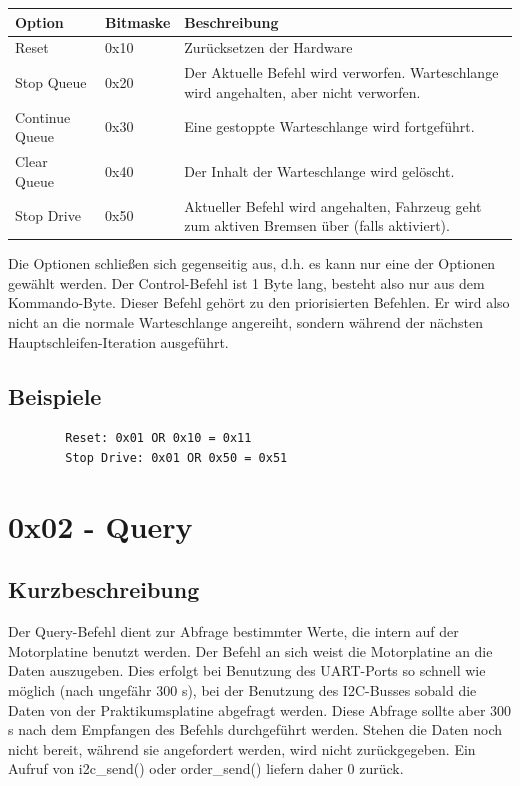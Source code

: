 \documentclass[a4paper]{article}
\begin{document}
	\begin{tabularx}{\linewidth}{|l|l|X|}
		\hline
		\textbf{Option} & \textbf{Bitmaske} & \textbf{Beschreibung} \\
		\hline
		\hline
		Reset 			& 0x10 				& Zurücksetzen der Hardware \\
		\hline
		Stop Queue		& 0x20				& Der Aktuelle Befehl wird verworfen. Warteschlange wird angehalten, aber nicht verworfen. \\
		\hline
		Continue Queue	& 0x30				& Eine gestoppte Warteschlange wird fortgeführt. \\
		\hline
		Clear Queue		& 0x40				& Der Inhalt der Warteschlange wird gelöscht. \\
		\hline
		Stop Drive		& 0x50				& Aktueller Befehl wird angehalten, Fahrzeug geht zum aktiven Bremsen über (falls aktiviert). \\
		\hline
	\end{tabularx}

	Die Optionen schließen sich gegenseitig aus, d.h. es kann nur eine der
	Optionen gewählt werden. Der Control-Befehl ist 1 Byte lang, besteht also
	nur aus dem Kommando-Byte. Dieser Befehl gehört zu den priorisierten
	Befehlen. Er wird also nicht an die normale Warteschlange angereiht,
	sondern während der nächsten Hauptschleifen-Iteration ausgeführt.


	\subsection{Beispiele}
	
	\begin{verbatim}
		Reset: 0x01 OR 0x10 = 0x11
		Stop Drive: 0x01 OR 0x50 = 0x51
	\end{verbatim}
	
	\pagebreak

	\section{0x02 - Query}

	\subsection{Kurzbeschreibung}

	Der Query-Befehl dient zur Abfrage bestimmter Werte, die intern auf der
	Motorplatine benutzt werden. Der Befehl an sich weist die Motorplatine
	an die Daten auszugeben. Dies erfolgt bei Benutzung des UART-Ports so
	schnell wie möglich (nach ungefähr 300 \textmu{}s), bei der Benutzung
	des I2C-Busses sobald die Daten von der Praktikumsplatine abgefragt
	werden. Diese Abfrage sollte aber 300 \textmu{}s nach dem Empfangen
	des Befehls durchgeführt werden. Stehen die Daten noch nicht bereit,
	während sie angefordert werden, wird nicht zurückgegeben. Ein Aufruf
	von i2c\_send() oder order\_send() liefern daher 0 zurück.
\end{document}
